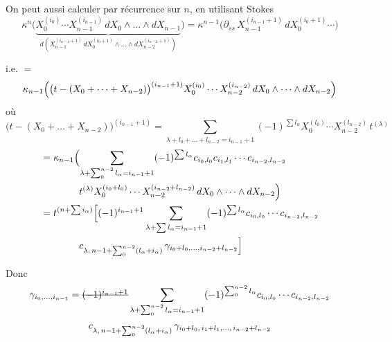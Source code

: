 \documentclass[11pt,a4paper]{article}
\begin{document}
On peut aussi calculer par récurrence sur $n$, en utilisant Stokes
\[
  \kappa^{n}\bigl(\underbrace{X_0^{(i_0)}\cdots X_{n-1}^{(i_{n-1})}\,
  dX_0\wedge\dots\wedge dX_{n-1}}_{d\left(X_{n-1}^{(i_{n-1}+1)}\,
  dX_0^{(i_0+1)}\wedge\dots\wedge dX_{n-2}^{(i_{n-2}+1)}\right)}\bigr)
  =\kappa^{n-1}\bigl(\partial_{ss}\,X_{n-1}^{(i_{n-1}+1)}\,
  dX_0^{(i_0+1)}\cdots\bigr)
\]

i.e.  $=$
\[
  \kappa_{n-1}\Bigl(\bigl(t-(X_0+\dots+X_{n-2})\bigr)^{(i_{n-1}+1)}
  X_0^{(i_0)}\cdots X_{n-2}^{(i_{n-2})}\,dX_0\wedge\dots\wedge dX_{n-2}\Bigr)
\]
où
\[
  \bigl(t-(X_0+\dots+X_{n-2})\bigr)^{(i_{n-1}+1)}
  =\sum_{\lambda+l_0+\dots+l_{n-2}=i_{n-1}+1}
  (-1)^{\sum l_\alpha}X_0^{(l_0)}\cdots X_{n-2}^{(l_{n-2})}\,t^{(\lambda)}
\]
\begin{align*}
  &=\kappa_{n-1}\Bigl(\sum_{\lambda+\sum_0^{n-2}l_\alpha=i_{n-1}+1}
    (-1)^{\sum l_\alpha}c_{i_0,l_0}c_{i_1,l_1}\cdots c_{i_{n-2},l_{n-2}}\\
  &\qquad\qquad t^{(\lambda)}X_0^{(i_0+l_0)}\cdots X_{n-2}^{(i_{n-2}+l_{n-2})}\,
    dX_0\wedge\dots\wedge dX_{n-2}\Bigr)\\
  &=t^{(n+\sum i_\alpha)}\Bigl[(-1)^{i_{n-1}+1}
    \sum_{\lambda+\sum l_\alpha=i_{n-1}+1}(-1)^{\sum l_\alpha}
    c_{i_0,l_0}\cdots c_{i_{n-2},l_{n-2}}\\
  &\qquad\qquad c_{\lambda,\,n-1+\sum_0^{n-2}(l_\alpha+i_\alpha)}\,
    \gamma_{i_0+l_0,\dots,i_{n-2}+l_{n-2}}\Bigr]
\end{align*}

Donc
\[
  \begin{aligned}
  \gamma_{i_0,\dots,i_{n-1}}&=\text{\struck{$(-1)^{i_{n-1}+1}$}}
  \sum_{\lambda+\sum_0^{n-2}l_\alpha=i_{n-1}+1}
  (-1)^{\sum_0^{n-2}l_\alpha}c_{i_0,l_0}\cdots c_{i_{n-2},l_{n-2}}\\
  &\qquad c_{\lambda,\,n-1+\sum_0^{n-2}(l_\alpha+i_\alpha)}\,
  \gamma_{i_0+l_0,\,i_1+l_1,\dots,\,i_{n-2}+l_{n-2}}
  \end{aligned}
\]
\end{document}
